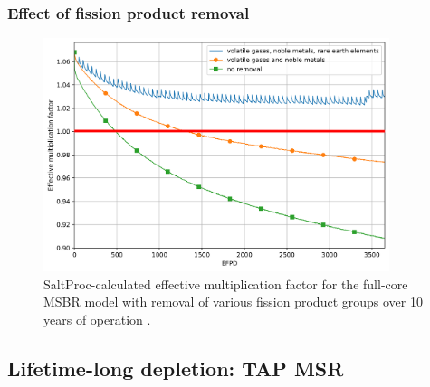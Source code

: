 \begin{frame}
\frametitle{Effect of fission product removal}       

\begin{figure}[t] %
	\centering
	\includegraphics[width=0.9\textwidth]{./images/keff_rem_cases.png}
	 
		\vspace{-3mm}
	\caption{SaltProc-calculated effective multiplication factor for the 
	full-core \gls{MSBR} model with removal of various fission product groups 
	over 10	years of operation \cite{rykhlevskii_modeling_2019}.}
\end{figure}

\end{frame}



\subsection{Lifetime-long depletion: \gls{TAP} MSR}

